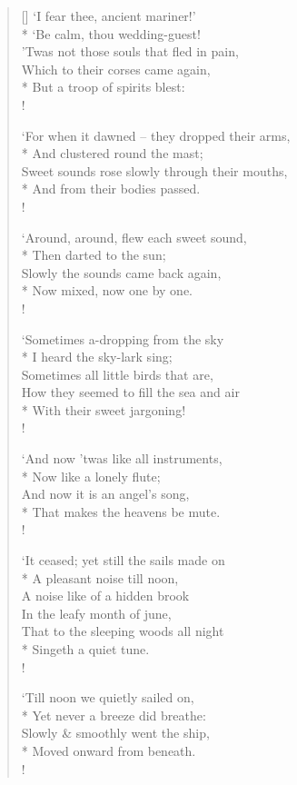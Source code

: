 \documentclass[MAIN]{subfiles}
\begin{document}
\begin{verse}[\versewidth]
`I fear thee, ancient mariner!'\\* 
\vin `Be calm, thou wedding-guest!\\
'Twas not those souls that fled in pain,\\
Which to their corses came again,\\*
\vin But a troop of spirits blest:\\!

`For when it dawned -- they dropped their arms,\\*
\vin And clustered round the mast;\\
Sweet sounds rose slowly through their mouths,\\*
\vin And from their bodies passed.\\!

`Around, around, flew each sweet sound,\\*
\vin Then darted to the sun;\\
Slowly the sounds came back again,\\*
\vin Now mixed, now one by one.\\!

`Sometimes a-dropping from the sky\\*
\vin I heard the sky-lark sing;\\
Sometimes all little birds that are,\\
How they seemed to fill the sea and air\\*
\vin With their sweet jargoning!\\!

`And now 'twas like all instruments,\\*
\vin Now like a lonely flute;\\
And now it is an angel's song,\\*
\vin That makes the heavens be mute.\\!

`It ceased; yet still the sails made on\\*
\vin A pleasant noise till noon,\\
A noise like of a hidden brook\\
\vin In the leafy month of june,\\
That to the sleeping woods all night\\*
\vin Singeth a quiet tune.\\!

`Till noon we quietly sailed on,\\*
\vin Yet never a breeze did breathe:\\
Slowly \& smoothly went the ship,\\*
\vin Moved onward from beneath.\\!


\end{verse}
\end{document}
